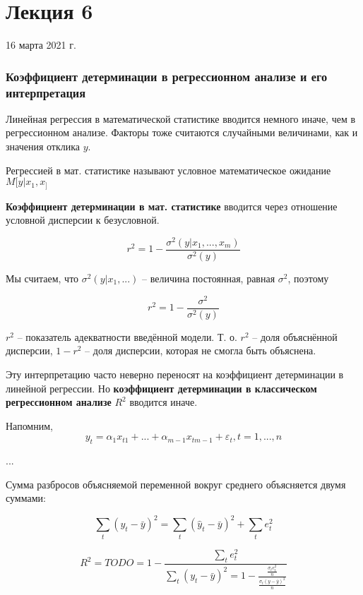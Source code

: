 \documentclass[main.tex]{subfiles}
\begin{document}
\section{Лекция 6}
16 марта 2021 г.

\subsubsection{Коэффициент детерминации в регрессионном анализе и его интерпретация}

Линейная регрессия в математической статистике вводится немного иначе, чем в регрессионном анализе.
Факторы тоже считаются случайными величинами, как и значения отклика $ y $.

Регрессией в мат. статистике называют условное математическое ожидание $ M[y|x_1,x_] $

\textbf{Коэффициент детерминации в мат. статистике} вводится через отношение условной дисперсии к безусловной.

$$ r^2 = 1 -  \frac{\sigma^2(y|x_1, ..., x_m)}{\sigma^2(y)} $$

Мы считаем, что $ \sigma^2(y|x_1,...) $ -- величина постоянная, равная $ \sigma^2 $, поэтому

$$ r^2 = 1 - \frac{\sigma^2}{\sigma^2(y)} $$

$ r^2 $ -- показатель адекватности введённой модели.
Т. о. $ r^2 $ -- доля объяснённой дисперсии, $ 1 - r^2 $ -- доля дисперсии, которая не смогла быть объяснена.

Эту интерпретацию часто неверно переносят на коэффициент детерминации в линейной регрессии.
Но \textbf{коэффициент детерминации в классическом регрессионном анализе}  $ R^2 $ вводится иначе.

Напомним,
\begin{equation} \label{eq:linreg}
    y_t = \alpha_1 x_{t1} + ... + \alpha_{m-1}x_{tm-1} + \varepsilon_t, t = 1,...,n
\end{equation}

...


Сумма разбросов объясняемой переменной вокруг среднего объясняется двумя суммами:

\begin{equation}\label{eq:linreg_deviances}
    \sum_t (y_t - \bar y)^2 = \sum_t (\hat y_t - \bar y)^2 + \sum_t e_t^2
\end{equation}

\begin{equation}
    R^2 = TODO =  1 - \frac{\sum_t e_t^2}{\sum_t (y_t - \bar y)^2 = 1 - \frac{\frac{\sigma_t e_t^2}{n}}{\frac{\sigma_t (y - \bar y)^2}{n}}}
\end{equation}
\end{document}
